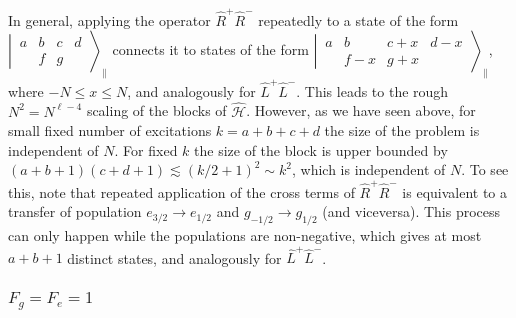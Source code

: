 \documentclass[aps,prx,superscriptaddress,twocolumn,notitlepage,nofootinbib,longbibliography]{revtex4-2}
\begin{document}
In general, applying the operator $\hat{R}^+\hat{R}^-$ repeatedly to a state of the form $\left|\, \begin{smallmatrix} a & b & c & d \\  & f & g &  \end{smallmatrix} \,\right\rangle_\parallel$ connects it to states of the form $\left|\, \begin{smallmatrix} a & b & c+x & d-x \\  & f-x & g+x &  \end{smallmatrix} \,\right\rangle_\parallel$, where $-N\leq x \leq N$, and analogously for $\hat{L}^+\hat{L}^-$. This leads to the rough $N^2=N^{\ell-4}$ scaling of the blocks of $\hat{\mathcal{H}}$. However, as we have seen above, for small fixed number of excitations $k=a+b+c+d$ the size of the problem is independent of $N$. For fixed $k$ the size of the block is upper bounded by $(a+b+1)(c+d+1) \lesssim (k/2+1)^2 \sim k^2$, which is independent of $N$.
To see this, note that repeated application of the cross terms of $\hat{R}^+\hat{R}^-$ is equivalent to a transfer of population $e_{3/2}\rightarrow e_{1/2}$ and $g_{-1/2}\rightarrow g_{1/2}$ (and viceversa). This process can only happen while the populations are non-negative, which gives at most $a+b+1$ distinct states, and analogously for $\hat{L}^+\hat{L}^-$.




\subsubsection{\texorpdfstring{$F_g=F_e=1$}{Fg=Fe=1}}
\end{document}
